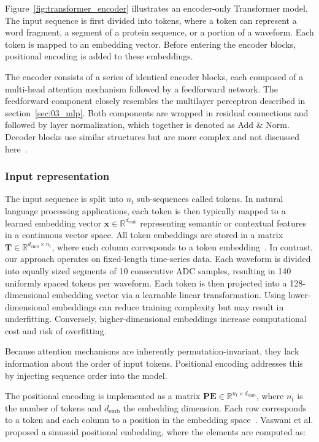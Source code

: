 Figure~\ref{fig:transformer_encoder} illustrates an encoder-only Transformer model. The input sequence is first divided into tokens, where a token can represent a word fragment, a segment of a protein sequence, or a portion of a waveform. Each token is mapped to an embedding vector. Before entering the encoder blocks, positional encoding is added to these embeddings. 

The encoder consists of a series of identical encoder blocks, each composed of a multi-head attention mechanism followed by a feedforward network. The feedforward component closely resembles the multilayer perceptron described in section~\ref{sec:03_mlp}. 
Both components are wrapped in residual connections and followed by layer normalization, which together is denoted as Add \& Norm. Decoder blocks use similar structures but are more complex and not discussed here~\cite{murphy_probabilistic_2022, prince_understanding_2023, vaswani_attention_2023}.


\subsubsection{Input representation}
\label{sec:03_input_representation}

The input sequence is split into $n_t$ sub-sequences called tokens. In natural language processing applications, each token is then typically mapped to a learned embedding vector $\mathbf{x} \in \mathbb{R}^{d_{\mathrm{emb}}}$ representing semantic or contextual features in a continuous vector space. All token embeddings are stored in a matrix $\mathbf{T} \in \mathbb{R}^{d_{\mathrm{emb}} \times n_t}$, where each column corresponds to a token embedding~\cite{zhang_dive_2023, prince_understanding_2023}.
In contrast, our approach operates on fixed-length time-series data. Each waveform is divided into equally sized segments of 10 consecutive ADC samples, resulting in 140 uniformly spaced tokens per waveform. Each token is then projected into a 128-dimensional embedding vector via a learnable linear transformation. Using lower-dimensional embeddings can reduce training complexity but may result in underfitting. Conversely, higher-dimensional embeddings increase computational cost and risk of overfitting. 

Because attention mechanisms are inherently permutation-invariant, they lack information about the order of input tokens. Positional encoding addresses this by injecting sequence order into the model. 

The  positional encoding is implemented as a matrix $\mathbf{PE} \in \mathbb{R}^{n_t \times d_{\mathrm{emb}}}$, where $n_t$ is the number of tokens and $d_{\mathrm{emb}}$ the embedding dimension. Each row corresponds to a token and each column to a position in the embedding space~\cite{zhang_dive_2023}.
Vaswani et al. proposed a sinusoid positional embedding, where the elements are computed as:

